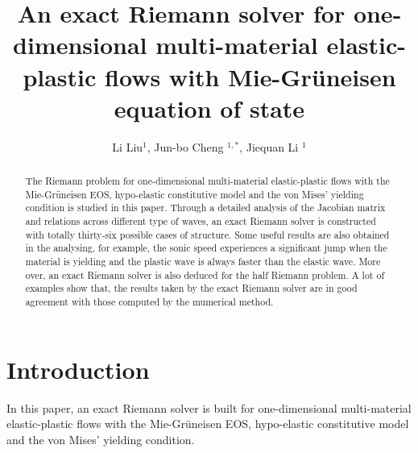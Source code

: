 \documentclass{article}
\numberwithin{equation}{section}
\numberwithin{table}{section}
\begin{document}
\title{An exact Riemann solver for one-dimensional multi-material elastic-plastic flows with Mie-Gr\"uneisen equation of state}
\author{Li Liu$^1$, Jun-bo Cheng $^{1,*}$, Jiequan Li $^{1}$}

\maketitle


\begin{abstract}
  The Riemann problem for one-dimensional  multi-material elastic-plastic flows with the Mie-Gr\"uneisen EOS, hypo-elastic constitutive model and  the von Mises' yielding condition is studied in this paper.  Through a detailed analysis of the Jacobian matrix and relations across different type of waves,  an exact Riemann solver is constructed with totally thirty-six possible cases of structure.  Some useful results are also obtained in the analysing, for example, the sonic speed experiences a significant jump when the material is yielding and the plastic wave is always faster than the elastic wave.  More over, an exact Riemann solver is also deduced for the half Riemann problem. A lot of examples show that, the results taken by the exact Riemann solver are in good agreement with those computed by the mumerical method.

\end{abstract}



\section{Introduction}

In this paper, an exact Riemann solver is built for one-dimensional  multi-material elastic-plastic flows with the Mie-Gr\"uneisen EOS, hypo-elastic constitutive model \cite{wilkins1963calculation} and  the von Mises' yielding condition.
\end{document}
